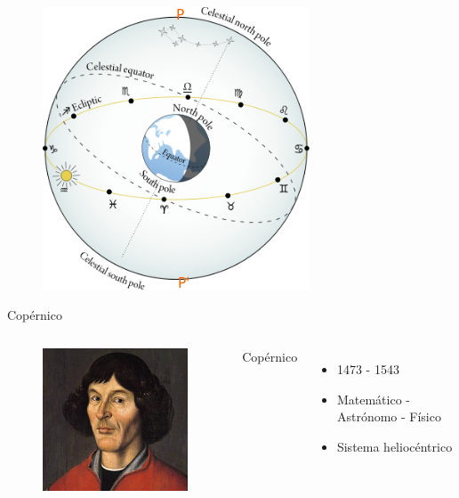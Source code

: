 \documentclass{beamer}
\begin{document}

\begin{frame}
\begin{figure}
 \centering
 \includegraphics[scale=0.6]{Imagenes/Geocentrico}
 \end{figure}
\end{frame}


\begin{frame}{Copérnico}
\begin{columns}
\begin{figure}
 \centering
 \includegraphics[scale=0.6]{Imagenes/Copernico}
 \end{figure}
 \begin{center}
 \small
 Copérnico 
 \end{center}
\begin{itemize}
\item 1473 - 1543 
\item Matemático - Astrónomo - Físico 
\item Sistema heliocéntrico 
\end{itemize}
\end{columns}
\end{frame}
\end{document}
